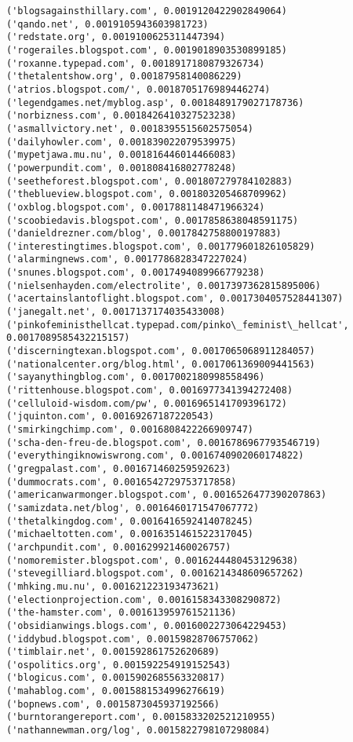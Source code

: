 \documentclass[11pt]{article}
\begin{document}
\begin{Verbatim}[commandchars=\\\{\}]
('blogsagainsthillary.com', 0.0019120422902849064)
('qando.net', 0.0019105943603981723)
('redstate.org', 0.0019100625311447394)
('rogerailes.blogspot.com', 0.0019018903530899185)
('roxanne.typepad.com', 0.0018917180879326734)
('thetalentshow.org', 0.00187958140086229)
('atrios.blogspot.com/', 0.0018705176989446274)
('legendgames.net/myblog.asp', 0.0018489179027178736)
('norbizness.com', 0.0018426410327523238)
('asmallvictory.net', 0.0018395515602575054)
('dailyhowler.com', 0.001839022079539975)
('mypetjawa.mu.nu', 0.001816446014466083)
('powerpundit.com', 0.001808416802778248)
('seetheforest.blogspot.com', 0.001807279784102883)
('theblueview.blogspot.com', 0.001803205468709962)
('oxblog.blogspot.com', 0.0017881148471966324)
('scoobiedavis.blogspot.com', 0.0017858638048591175)
('danieldrezner.com/blog', 0.0017842758800197883)
('interestingtimes.blogspot.com', 0.001779601826105829)
('alarmingnews.com', 0.0017786828347227024)
('snunes.blogspot.com', 0.0017494089966779238)
('nielsenhayden.com/electrolite', 0.0017397362815895006)
('acertainslantoflight.blogspot.com', 0.0017304057528441307)
('janegalt.net', 0.0017137174035433008)
('pinkofeministhellcat.typepad.com/pinko\_feminist\_hellcat', 0.0017089585432215157)
('discerningtexan.blogspot.com', 0.0017065068911284057)
('nationalcenter.org/blog.html', 0.0017061369009441563)
('sayanythingblog.com', 0.0017002180998558496)
('rittenhouse.blogspot.com', 0.0016977341394272408)
('celluloid-wisdom.com/pw', 0.0016965141709396172)
('jquinton.com', 0.00169267187220543)
('smirkingchimp.com', 0.0016808422266909747)
('scha-den-freu-de.blogspot.com', 0.0016786967793546719)
('everythingiknowiswrong.com', 0.0016740902060174822)
('gregpalast.com', 0.001671460259592623)
('dummocrats.com', 0.0016542729753717858)
('americanwarmonger.blogspot.com', 0.0016526477390207863)
('samizdata.net/blog', 0.0016460171547067772)
('thetalkingdog.com', 0.0016416592414078245)
('michaeltotten.com', 0.0016351461522317045)
('archpundit.com', 0.001629921460026757)
('nomoremister.blogspot.com', 0.0016244480453129638)
('stevegilliard.blogspot.com', 0.0016214348609657262)
('mhking.mu.nu', 0.001621223193473621)
('electionprojection.com', 0.0016158343308290872)
('the-hamster.com', 0.001613959761521136)
('obsidianwings.blogs.com', 0.0016002273064229453)
('iddybud.blogspot.com', 0.00159828706757062)
('timblair.net', 0.001592861752620689)
('ospolitics.org', 0.001592254919152543)
('blogicus.com', 0.0015902685563320817)
('mahablog.com', 0.0015881534996276619)
('bopnews.com', 0.0015873045937192566)
('burntorangereport.com', 0.0015833202521210955)
('nathannewman.org/log', 0.0015822798107298084)

\end{Verbatim}
\end{document}
